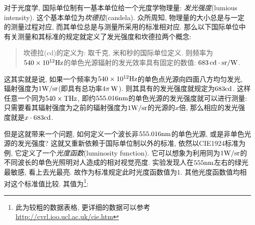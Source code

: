 对于光度学, 国际单位制有一基本单位给一个光度学物理量: \emph{发光强度}(lumious intensity). 这个基本单位为\emph{坎德拉}(candela). 众所周知, 物理量的大小总是与一定的测量过程对应, 而其单位总是与测量所采用的标准相对应. 那么以下国际单位中有关测量和其标准的规定就定义了发光强度和坎德拉两个概念:

\begin{verse}
坎德拉(cd)的定义为: 取千克, 米和秒的国际单位定义. 则频率为$540\times 10^{12}{\rm Hz}$的单色光源辐射的发光效率具有固定的数值: $683\, {\rm cd\cdot sr/W}$.
\end{verse}

这其实就是说, 如果一个频率为$540\times 10^{12}{\rm Hz}$的单色点光源向四面八方均匀发光, 辐射强度为$1{\rm W/sr}$(即具有总功率$4\pi\, {\rm W}$). 则其具有的发光强度就规定为$683{\rm cd}$. 这样任意一个同为$540\times {\rm THz}$, 即约$555.016{\rm nm}$的单色光源的发光强度就可以进行测量: 只需要看其辐射强度为之前的辐射强度为$1{\rm W/sr}$的光源的$x$倍, 那么相应的发光强度就是$x\cdot 683{\rm cd}$.

但是这就带来一个问题, 如何定义一个波长非$555.016{\rm nm}$的单色光源, 或是非单色光源的发光强度? 这就又重新依赖于国际单位制以外的标准, 依然以CIE1924标准为例, 它定义了一个\emph{光度函数}(luminosity function). 它可以想象为利用同为$1{\rm W/sr}$的不同波长的单色光照明对人造成的相对视觉亮度. 实验发现人在$555{\rm nm}$左右的绿光最敏感, 看上去光最亮. 故作为标准规定此时光度函数值为$1$. 其他光度函数值均相对这个标准值比较. 其值为\footnote{此为较粗的数据表格, 更详细的数据可以参考\url{http://cvrl.ioo.ucl.ac.uk/cie.htm}}:



